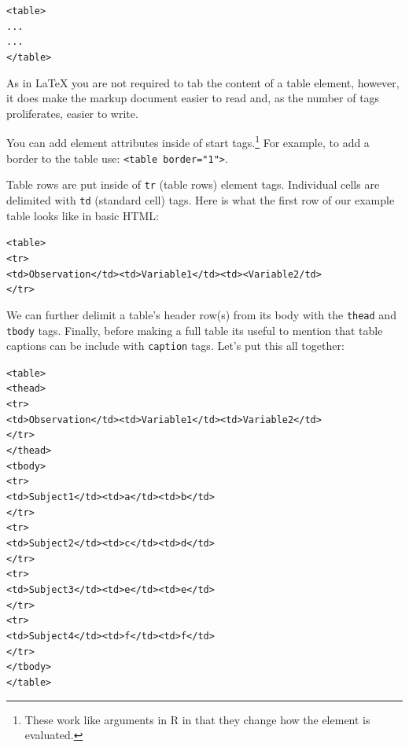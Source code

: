 \begin{knitrout}
\color{fgcolor}\begin{kframe}
\begin{alltt}
<table>
    . . .
    . . .
</table>
\end{alltt}
\end{kframe}
\end{knitrout}


\noindent As in LaTeX you are not required to tab the content of a table element, however, it does make the markup document easier to read and, as the number of tags proliferates, easier to write.

You can add element attributes inside of start tags.\footnote{These work like arguments in R in that they change how the element is evaluated.} For example, to add a border to the table use: \verb|<table border="1">|.

Table rows are put inside of \texttt{tr} (table rows) element tags. Individual cells are delimited with \texttt{td} (standard cell) tags. Here is what the first row of our example table looks like in basic HTML:

\begin{knitrout}
\color{fgcolor}\begin{kframe}
\begin{alltt}
<table>
    <tr>
        <td>Observation</td> <td>Variable1</td> <td><Variable2/td>
    </tr>
\end{alltt}
\end{kframe}
\end{knitrout}


\noindent We can further delimit a table's header row(s) from its body with the \texttt{thead} and \texttt{tbody} tags. Finally, before making a full table its useful to mention that table captions can be include with \texttt{caption} tags. Let's put this all together:

{\small
\begin{knitrout}
\color{fgcolor}\begin{kframe}
\begin{alltt}
<table>
    <thead>
        <tr>
            <td>Observation</td> <td>Variable1</td> <td>Variable2</td>
        </tr>
    </thead>
    <tbody>
        <tr>
            <td>Subject1</td> <td>a</td> <td>b</td>
        </tr>
        <tr>
            <td>Subject2</td> <td>c</td> <td>d</td>
        </tr>
        <tr>
            <td>Subject3</td> <td>e</td> <td>e</td>
        </tr>
        <tr>
            <td>Subject4</td> <td>f</td> <td>f</td>
        </tr>      
    </tbody>
</table>
\end{alltt}
\end{kframe}
\end{knitrout}

}

